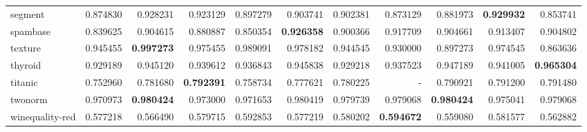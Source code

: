 \begin{tabular}{lrrrrrrrrrr}
segment         &   0.874830 &  0.928231 &  0.923129 &  0.897279 &  0.903741 &  0.902381 &  0.873129 &  0.881973 &  \textbf{0.929932} &  0.853741 \\
spambase        &   0.839625 &  0.904615 &  0.880887 &  0.850354 &  \textbf{0.926358} &  0.900366 &  0.917709 &  0.904661 &  0.913407 &  0.904802 \\
texture         &   0.945455 &  \textbf{0.997273} &  0.975455 &  0.989091 &  0.978182 &  0.944545 &  0.930000 &  0.897273 &  0.974545 &  0.863636 \\
thyroid         &   0.929189 &  0.945120 &  0.939612 &  0.936843 &  0.945838 &  0.929218 &  0.937523 &  0.947189 &  0.941005 &  \textbf{0.965304} \\
titanic         &   0.752960 &  0.781680 &  \textbf{0.792391} &  0.758734 &  0.777621 &  0.780225 &       - &  0.790921 &  0.791200 &  0.791480 \\
twonorm         &   0.970973 &  \textbf{0.980424} &  0.973000 &  0.971653 &  0.980419 &  0.979739 &  0.979068 &  \textbf{0.980424} &  0.975041 &  0.979068 \\
winequality-red &   0.577218 &  0.566490 &  0.579715 &  0.592853 &  0.577219 &  0.580202 &  \textbf{0.594672} &  0.559080 &  0.581577 &  0.562882 \\
\bottomrule
\end{tabular}
